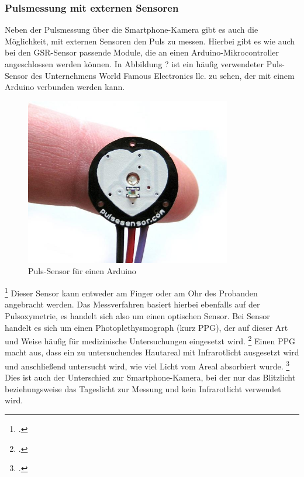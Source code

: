 {\subsubsection{Pulsmessung mit externen Sensoren}
Neben der Pulsmessung über die Smartphone-Kamera gibt es auch die Möglichkeit, mit externen Sensoren den Puls zu messen. Hierbei gibt es wie auch bei den GSR-Sensor passende Module, die an einen Arduino-Mikrocontroller angeschlossen werden können. \newline
In Abbildung ? ist ein häufig verwendeter Puls-Sensor des Unternehmens World Famous Electronics llc. zu sehen, der mit einem Arduino verbunden werden kann. \newline
\begin{figure}[h]
	\centering
	\includegraphics[width=9cm]{Bilder/pulsesensor.jpg}
	\caption[Puls-Sensor für einen Arduino]{Puls-Sensor für einen Arduino\footnotemark}
\end{figure}\footcitetext{Wor18a} \newline
Dieser Sensor kann entweder am Finger oder am Ohr des Probanden angebracht werden. Das Messverfahren basiert hierbei ebenfalls auf der Pulsoxymetrie, es handelt sich also um einen optischen Sensor. Bei Sensor handelt es sich um einen Photoplethysmograph (kurz PPG), der auf dieser Art und Weise häufig für medizinische Untersuchungen eingesetzt wird. \footcite[Vgl. ][]{Wor18b}
Einen PPG macht aus, dass ein zu untersuchendes Hautareal mit Infrarotlicht ausgesetzt wird und anschließend untersucht wird, wie viel Licht vom Areal absorbiert wurde. \footcite[Vgl. ][S. 38]{Rab06}
Dies ist auch der Unterschied zur Smartphone-Kamera, bei der nur das Blitzlicht beziehungsweise das Tageslicht zur Messung und kein Infrarotlicht verwendet wird.
}

